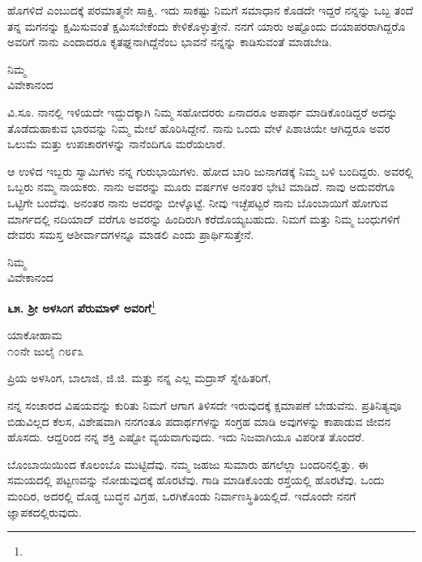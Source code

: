 ಹೊಗಳಿದೆ ಎಂಬುದಕ್ಕೆ ಪರಮಾತ್ಮನೇ ಸಾಕ್ಷಿ. ಇದು ಸಾಕಷ್ಟು ನಿಮಗೆ ಸಮಾಧಾನ ಕೊಡದೇ ಇದ್ದರೆ ನನ್ನನ್ನು ಒಬ್ಬ ತಂದೆ ತನ್ನ ಮಗನನ್ನು ಕ್ಷಮಿಸುವಂತೆ ಕ್ಷಮಿಸಬೇಕೆಂದು ಕೇಳಿಕೊಳ್ಳುತ್ತೇನೆ. ನನಗೆ ಯಾರು ಅಷ್ಟೊಂದು ದಯಾಪರರಾಗಿದ್ದರೊ ಅವರಿಗೆ ನಾನು ಎಂದಾದರೂ ಕೃತಘ್ನನಾಗಿದ್ದೆನೆಂಬ ಭಾವನೆ ನನ್ನನ್ನು ಕಾಡಿಸುವಂತೆ ಮಾಡಬೇಡಿ.

\vspace{-0.55cm}

{\flushright
ನಿಮ್ಮ\\ವಿವೇಕಾನಂದ\par}

ವಿ.ಸೂ. \enginline{-} ನಾನಲ್ಲಿ ಇಳಿಯದೇ ಇದ್ದುದಕ್ಕಾಗಿ ನಿಮ್ಮ ಸಹೋದರರು ಏನಾದರೂ ಅಪಾರ್ಥ ಮಾಡಿಕೊಂಡಿದ್ದರೆ ಅದನ್ನು ತೊಡೆದುಹಾಕುವ ಭಾರವನ್ನು ನಿಮ್ಮ ಮೇಲೆ ಹೊರಿಸಿದ್ದೇನೆ. ನಾನು ಒಂದು ವೇಳೆ ಪಿಶಾಚಿಯೇ ಆಗಿದ್ದರೂ ಅವರ ಒಲುಮೆ ಮತ್ತು ಉಪಚಾರಗಳನ್ನು ನಾನೆಂದಿಗೂ ಮರೆಯಲಾರೆ.

ಆ ಉಳಿದ ಇಬ್ಬರು ಸ್ವಾಮಿಗಳು ನನ್ನ ಗುರುಭಾಯಿಗಳು. ಹೋದ ಬಾರಿ ಜುನಾಗಡಕ್ಕೆ ನಿಮ್ಮ ಬಳಿ ಬಂದಿದ್ದರು. ಅವರಲ್ಲಿ ಒಬ್ಬರು ನಮ್ಮ ನಾಯಕರು. ನಾನು ಅವರನ್ನು ಮೂರು ವರ್ಷಗಳ ಅನಂತರ ಭೇಟಿ ಮಾಡಿದೆ. ನಾವು ಅದುವರೆಗೂ ಒಟ್ಟಿಗೇ ಬಂದೆವು. ಅನಂತರ ನಾನು ಅವರನ್ನು ಬೀಳ್ಕೊಟ್ಟೆ. ನೀವು ಇಚ್ಛೆಪಟ್ಟರೆ ನಾನು ಬೊಂಬಾಯಿಗೆ ಹೋಗುವ ಮಾರ್ಗದಲ್ಲಿ ನದಿಯಾದ್ ವರೆಗೂ ಅವರನ್ನು ಹಿಂದಿರುಗಿ ಕರೆದೊಯ್ಯಬಹುದು. ನಿಮಗೆ ಮತ್ತು ನಿಮ್ಮ ಬಂಧುಗಳಿಗೆ ದೇವರು ಸಮಸ್ತ ಆಶೀರ್ವಾದಗಳನ್ನೂ ಮಾಡಲಿ ಎಂದು ಪ್ರಾರ್ಥಿಸುತ್ತೇನೆ.


{\flushright
ನಿಮ್ಮ\\ವಿವೇಕಾನಂದ\par}

\begin{center}
\textbf{೬೫. ಶ‍್ರೀ ಅಳಸಿಂಗ ಪೆರುಮಾಳ್ ಅವರಿಗೆ}\footnote{}
\end{center}


\begin{flushright}
ಯಾಕೋಹಾಮ\\೧೦ನೇ ಜುಲೈ ೧೮೯೩
\end{flushright}

\noindent
ಪ್ರಿಯ ಅಳಸಿಂಗ, ಬಾಲಾಜಿ, ಜಿ.ಜಿ. ಮತ್ತು ನನ್ನ ಎಲ್ಲ ಮದ್ರಾಸ್ ಸ್ನೇಹಿತರಿಗೆ,

ನನ್ನ ಸಂಚಾರದ ವಿಷಯವನ್ನು ಕುರಿತು ನಿಮಗೆ ಆಗಾಗ ತಿಳಿಸದೇ ಇರುವುದಕ್ಕೆ ಕ್ಷಮಾಪಣೆ ಬೇಡುವೆನು. ಪ್ರತಿನಿತ್ಯವೂ ಬಿಡುವಿಲ್ಲದ ಕೆಲಸ, ವಿಶೇಷವಾಗಿ ನನಗಂತೂ ಪದಾರ್ಥಗಳನ್ನು ಸಂಗ್ರಹ ಮಾಡಿ ಅವುಗಳನ್ನು ಕಾಪಾಡುವ ಜೀವನ ಹೊಸದು. ಆದ್ದರಿಂದ ನನ್ನ ಶಕ್ತಿ ಎಷ್ಟೋ ವ್ಯಯವಾಗುವುದು. ಇದು ನಿಜವಾಗಿಯೂ ವಿಪರೀತ ತೊಂದರೆ.

ಬೊಂಬಾಯಿಯಿಂದ ಕೊಲಂಬೊ ಮುಟ್ಟಿದೆವು. ನಮ್ಮ ಜಹಜು ಸುಮಾರು ಹಗಲೆಲ್ಲಾ ಬಂದರಿನಲ್ಲಿತ್ತು. ಈ ಸಮಯದಲ್ಲಿ ಪಟ್ಟಣವನ್ನು ನೋಡುವುದಕ್ಕೆ ಹೊರಟೆವು. ಗಾಡಿ ಮಾಡಿಕೊಂಡು ರಸ್ತೆಯಲ್ಲಿ ಹೊರಟೆವು. ಒಂದು ಮಂದಿರ, ಅದರಲ್ಲಿ ದೊಡ್ಡ ಬುದ್ಧನ ವಿಗ್ರಹ, ಒರಗಿಕೊಂಡು ನಿರ್ವಾಣಸ್ಥಿತಿಯಲ್ಲಿದೆ. ಇದೊಂದೇ ನನಗೆ ಜ್ಞಾಪಕದಲ್ಲಿರುವುದು.

